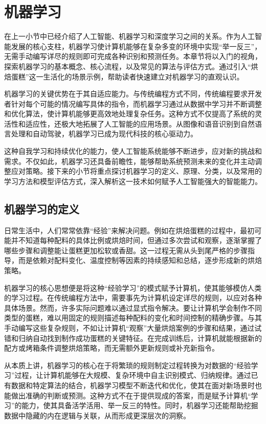 \section{机器学习}

在上一小节中已经介绍了人工智能、机器学习和深度学习之间的关系。作为人工智能发展的核心支柱，机器学习使计算机能够在复杂多变的环境中实现“举一反三”，无需手动编写详尽的规则即可完成各种识别和预测任务。本章节将以入门的视角，探索机器学习的基本概念、核心流程，以及常见的算法与评估方式。通过引入“烘焙蛋糕”这一生活化的场景示例，帮助读者快速建立对机器学习的直观认识。

机器学习的关键优势在于其自适应能力。与传统编程方式不同，传统编程要求开发者针对每个可能的情况编写具体的指令，而机器学习通过从数据中学习并不断调整和优化算法，使计算机能够更高效地处理复杂任务。这种方式不仅提高了系统的灵活性和适应性，还极大地拓展了人工智能的应用场景。从图像和语音识别到自然语言处理和自动驾驶，机器学习已成为现代科技的核心驱动力。

这种自我学习和持续优化的能力，使人工智能系统能够不断进步，应对新的挑战和需求。不仅如此，机器学习还具备前瞻性，能够帮助系统预测未来的变化并主动调整应对策略。接下来的小节将重点探讨机器学习的定义、原理、分类，以及常用的学习方法和模型评估方式，深入解析这一技术如何赋予人工智能强大的智能能力。

\subsection{机器学习的定义}

日常生活中，人们常常依靠“经验”来解决问题。例如在烘焙蛋糕的过程中，最初可能并不知道每种配料的具体比例或烘焙时间，但通过多次尝试和观察，逐渐掌握了哪些步骤和调整能让蛋糕更加松软或香甜。这一过程无需从头到尾严格的步骤指导，而是依赖对配料变化、温度控制等因素的持续感知和总结，逐步形成新的烘焙策略。

机器学习的核心思想便是将这种“经验学习”的模式赋予计算机，使其能够模仿人类的学习过程。在传统编程方法中，需要事先为计算机设定详尽的规则，以应对各种具体场景。然而，许多实际问题难以通过显式指令解决。要让计算机学会制作不同类型的蛋糕，难以用固定的规则描述每种配料的变化和时间控制的精确步骤。与其手动编写这些复杂规则，不如让计算机“观察”大量烘焙案例的步骤和结果，通过试错和归纳自动找到制作成功蛋糕的关键特征。在完成训练后，计算机就能根据新的配方或烤箱条件调整烘焙策略，而无需额外更新规则或补充新指令。

从本质上讲，机器学习的核心在于将繁琐的规则制定过程转换为对数据的“经验学习”过程，让计算机能够在大规模、复杂环境中自主识别模式、归纳规律。通过已有数据和特定算法的结合，机器学习模型不断迭代和优化，使其在面对新场景时也能做出准确的判断或预测。这种方式不在于提供现成的答案，而是赋予计算机“学习”的能力，使其具备活学活用、举一反三的特性。同时，机器学习还能帮助挖掘数据中隐藏的内在逻辑与关联，从而形成更深层次的洞察。

